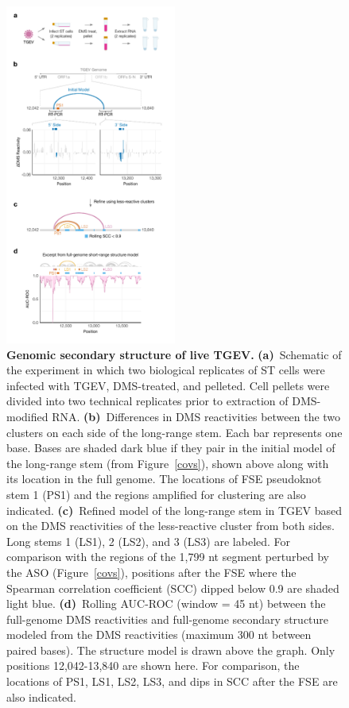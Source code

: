 \documentclass[main.tex]{subfiles}
\begin{document}
\begin{figure}[H]
	\includegraphics[width=0.5\textwidth]{../MainFigures/tgev/tgev.pdf}
	\caption{\textbf{Genomic secondary structure of live TGEV.} \textbf{(a)}~Schematic of the experiment in which two biological replicates of ST cells were infected with TGEV, DMS-treated, and pelleted. Cell pellets were divided into two technical replicates prior to extraction of DMS-modified RNA. \textbf{(b)}~Differences in DMS reactivities between the two clusters on each side of the long-range stem. Each bar represents one base. Bases are shaded dark blue if they pair in the initial model of the long-range stem (from Figure~\ref{covs}), shown above along with its location in the full genome. The locations of FSE pseudoknot stem 1 (PS1) and the regions amplified for clustering are also indicated. \textbf{(c)}~Refined model of the long-range stem in TGEV based on the DMS reactivities of the less-reactive cluster from both sides. Long stems 1 (LS1), 2 (LS2), and 3 (LS3) are labeled. For comparison with the regions of the 1,799 nt segment perturbed by the ASO (Figure~\ref{covs}), positions after the FSE where the Spearman correlation coefficient (SCC) dipped below 0.9 are shaded light blue. \textbf{(d)}~Rolling AUC-ROC (window = 45 nt) between the full-genome DMS reactivities and full-genome secondary structure modeled from the DMS reactivities (maximum 300 nt between paired bases). The structure model is drawn above the graph. Only positions 12,042-13,840 are shown here. For comparison, the locations of PS1, LS1, LS2, LS3, and dips in SCC after the FSE are also indicated.}
	\label{tgev}
\end{figure}
\end{document}
